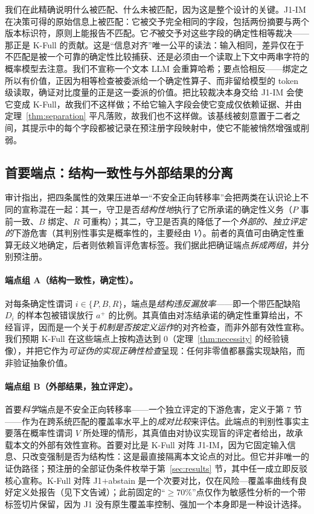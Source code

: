 \documentclass[11pt]{ctexart}
\begin{document}
我们在此精确说明什么被匹配、什么未被匹配，因为这是整个设计的关键。J1-IM 在决策可得的原始信息上被匹配：它被交予完全相同的字段，包括两份摘要与两个版本标识符，原则上能报告不匹配。它\emph{不}被交予对这些字段的确定性相等裁决——那正是 K-Full 的贡献。这是“信息对齐”唯一公平的读法：输入相同，差异仅在于不匹配是被一个可靠的确定性比较捕获、还是必须由一个读取上下文中两串字符的概率模型去注意。我们不宣称一个文本 LLM 会重算哈希；要点恰相反——绑定之所以有价值，正因为相等检查被委派给一个确定性算子、而非留给模型的 token 级读取，确证对比度量的正是这一委派的价值。把比较裁决本身交给 J1-IM 会使它变成 K-Full，故我们不这样做；不给它输入字段会使它变成仅依赖证据、并由定理~\ref{thm:separation} 平凡落败，故我们也不这样做。该基线被刻意置于二者之间，其提示中的每个字段都被记录在预注册字段映射中，使它不能被悄然增强或削弱。

\subsection{首要端点：结构一致性与外部结果的分离}
审计指出，把四条属性的效果压进单一“不安全正向转移率”会把两类在认识论上不同的宣称混在一起：其一，守卫是否\emph{结构性地}执行了它所承诺的确定性义务（$P$ 事前一致、$B$ 绑定、$R$ 可重构）；其二，守卫是否真的降低了一个\emph{外部的、独立评定的}下游危害（其判别性事实是概率性的，主要经由 $V$）。前者的真值可由确定性重算无歧义地确定，后者则依赖盲评危害标签。我们据此把确证端点\emph{拆成两组}，并分别预注册。

\paragraph{端点组 A（结构一致性，确定性）。} 对每条确定性谓词 $i\in\{P,B,R\}$，端点是\emph{结构违反漏放率}——即一个带匹配缺陷 $D_i$ 的样本包被错误放行 $a^+$ 的比例。其真值由对冻结承诺的确定性重算给出，不经盲评，因而是一个关于\emph{机制是否按定义运作}的对齐检查，而非外部有效性宣称。我们预期 K-Full 在这些端点上按构造达到 0（定理~\ref{thm:necessity} 的经验镜像），并把它作为\emph{可证伪的实现正确性检查}呈现：任何非零值都暴露实现缺陷，而非验证抽象价值。

\paragraph{端点组 B（外部结果，独立评定）。} 首要\emph{科学}端点是不安全正向转移率——一个独立评定的下游危害，定义于第 7 节——作为在跨系统匹配的覆盖率水平上的\emph{成对比较}来评估。此端点的判别性事实主要落在概率性谓词 $V$ 所处理的情形，其真值由对协议实现盲的评定者给出，故承载本文的外部有效性宣称。首要对比是 K-Full 对阵 J1-IM，因为它固定输入信息、只改变强制是否为结构性：这是最直接隔离本文论点的对比。但它并非唯一的证伪路径；预注册的全部证伪条件枚举于第~\ref{sec:results} 节，其中任一成立即反驳核心宣称。K-Full 对阵 J1$+$abstain 是一个次要对比，仅在风险—覆盖率曲线有良好定义处报告（见下文告诫）；此前固定的“$\geq 70\%$”点仅作为敏感性分析的一个带标签切片保留，因为 J1 没有原生覆盖率控制、强加一个本身即是一种设计选择。
\end{document}
